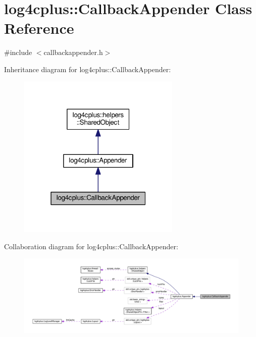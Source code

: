\hypertarget{classlog4cplus_1_1CallbackAppender}{\section{log4cplus\-:\-:Callback\-Appender Class Reference}
\label{classlog4cplus_1_1CallbackAppender}
}


{\ttfamily \#include $<$callbackappender.\-h$>$}



Inheritance diagram for log4cplus\-:\-:Callback\-Appender\-:
\nopagebreak
\begin{figure}[H]
\begin{center}
\leavevmode
\includegraphics[width=220pt]{classlog4cplus_1_1CallbackAppender__inherit__graph}
\end{center}
\end{figure}


Collaboration diagram for log4cplus\-:\-:Callback\-Appender\-:
\nopagebreak
\begin{figure}[H]
\begin{center}
\leavevmode
\includegraphics[width=350pt]{classlog4cplus_1_1CallbackAppender__coll__graph}
\end{center}
\end{figure}

